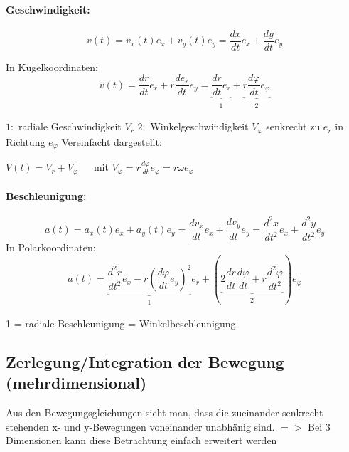 \documentclass[7pt]{article}
\begin{document}
\begin{multicols*}{3}
\paragraph{Geschwindigkeit:}
\begin{equation*}
v(t) = v_x(t)e_x + v_y(t)e_y = \frac{dx}{dt}e_x +\frac{dy}{dt}e_y 
\end{equation*}

In Kugelkoordinaten:
\begin{equation*}\label{eq:dN}
v(t) = \frac{dr}{dt}e_r + r\frac{de_r}{dt}e_y = \underbrace{\frac{dr}{dt}e_r}_{\substack{1}} + \underbrace{r\frac{d{\varphi}}{dt}e_{\varphi}}_{\substack{2}}
\end{equation*}

$1:$ radiale Geschwindigkeit $V_r$ \newline
$2:$ Winkelgeschwindigkeit $V_{\varphi}$ senkrecht zu $e_r$ in Richtung $e_{\varphi}$
\newline
\newline
Vereinfacht dargestellt:

$V(t) = V_r + V_{\varphi}$
$\>\>\>\>$ mit 
$V_{\varphi} = r\frac{d{\varphi}}{dt}e_{\varphi} = r{\omega}e_{\varphi}$

\paragraph{Beschleunigung:}
\begin{equation*}
a(t) = a_x(t)e_x + a_y(t)e_y = \frac{dv_x}{dt}e_x + \frac{dv_y}{dt}e_y = \frac{d^2x}{dt^2}e_x + \frac{d^2y}{dt^2}e_y
\end{equation*}\newline
In Polarkoordinaten:
\begin{equation*}
a(t) = \underbrace{\frac{d^2r}{dt^2}e_x - r\left(\frac{d\varphi}{dt}e_y\right)^2}_{\substack{1}}e_r + \left(\underbrace{2 \frac{dr}{dt}\frac{d\varphi}{dt}+r\frac{d^2\varphi}{dt^2}}_{\substack{2}}\right)e_\varphi
\end{equation*}

1 = radiale Beschleunigung  = Winkelbeschleunigung
\newline

\subsection{Zerlegung/Integration der Bewegung (mehrdimensional)}
Aus den Bewegungsgleichungen sieht man, dass die zueinander senkrecht stehenden x- und y-Bewegungen voneinander unabh{\"a}nig sind.
\newline
$=>$ Bei 3 Dimensionen kann diese Betrachtung einfach erweitert werden


\end{multicols*}
\end{document}
